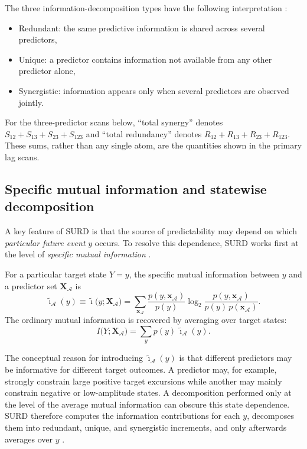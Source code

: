 \documentclass[fleqn,usenatbib]{mnras}
\begin{document}
The three information-decomposition types have the following interpretation \cite{MartinezSanchez2024SURD}:
\begin{itemize}
\item{Redundant:}  
the same predictive information is shared across several predictors,\\
\item{Unique:}  
a predictor contains information not available from any other predictor alone,\\
\item {Synergistic:}  
information appears only when several predictors are observed jointly.
\end{itemize}

For the three-predictor scans below, ``total synergy'' denotes
$S_{12}+S_{13}+S_{23}+S_{123}$ and ``total redundancy'' denotes
$R_{12}+R_{13}+R_{23}+R_{123}$. These sums, rather than any single atom,
are the quantities shown in the primary lag scans.

\iffalse
\subsection{Specific mutual information and statewise decomposition}

A key feature of SURD is that the source of predictability may depend on which \emph{particular future event} \(y\) occurs. To resolve this dependence, SURD works first at the level of \emph{specific mutual information} \cite{DeWeeseMeister1999,Butts2003,MartinezSanchez2024SURD}.

For a particular target state \(Y=y\), the specific mutual information between \(y\) and a predictor set \(\mathbf{X}_{\mathcal{A}}\) is
\begin{equation}
\tilde{\imath}_{\mathcal{A}}(y)
\equiv
\tilde{\imath}\bigl(y;\mathbf{X}_{\mathcal{A}}\bigr)
=
\sum_{\mathbf{x}_{\mathcal{A}}}
\frac{p(y,\mathbf{x}_{\mathcal{A}})}{p(y)}
\log_2
\frac{p(y,\mathbf{x}_{\mathcal{A}})}{p(y)\,p(\mathbf{x}_{\mathcal{A}})}.
\label{eq:specific_mi}
\end{equation}
The ordinary mutual information is recovered by averaging over target states:
\begin{equation}
I\bigl(Y;\mathbf{X}_{\mathcal{A}}\bigr)
=
\sum_{y} p(y)\,\tilde{\imath}_{\mathcal{A}}(y).
\label{eq:mi_from_specific}
\end{equation}

The conceptual reason for introducing \(\tilde{\imath}_{\mathcal{A}}(y)\) is that different predictors may be informative for different target outcomes. A predictor may, for example, strongly constrain large positive target excursions while another may mainly constrain negative or low-amplitude states. A decomposition performed only at the level of the average mutual information can obscure this state dependence. SURD therefore computes the information contributions for each \(y\), decomposes them into redundant, unique, and synergistic increments, and only afterwards averages over \(y\) \cite{MartinezSanchez2024SURD}.
\end{document}
